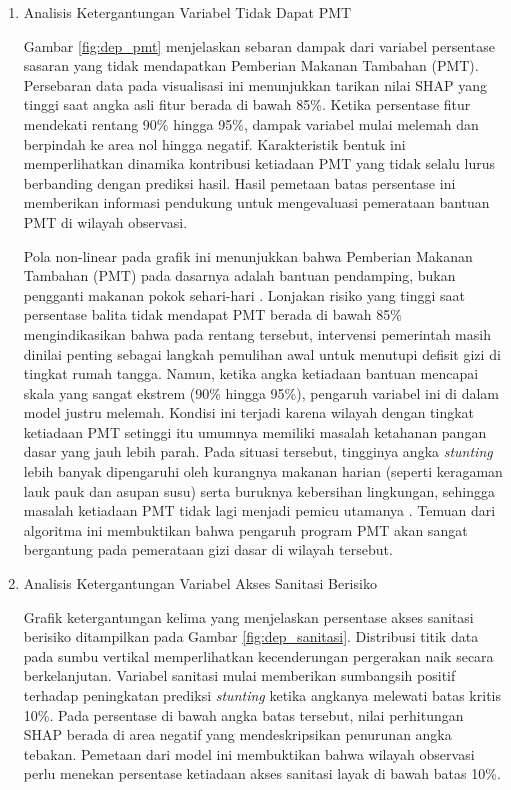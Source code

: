 \begin{enumerate}[listparindent=\parindent]
    \item Analisis Ketergantungan Variabel Tidak Dapat PMT
    
    Gambar \ref{fig:dep_pmt} menjelaskan sebaran dampak dari variabel persentase sasaran yang tidak mendapatkan Pemberian Makanan Tambahan (PMT). Persebaran data pada visualisasi ini menunjukkan tarikan nilai SHAP yang tinggi saat angka asli fitur berada di bawah 85\%. Ketika persentase fitur mendekati rentang 90\% hingga 95\%, dampak variabel mulai melemah dan berpindah ke area nol hingga negatif. Karakteristik bentuk ini memperlihatkan dinamika kontribusi ketiadaan PMT yang tidak selalu lurus berbanding dengan prediksi hasil. Hasil pemetaan batas persentase ini memberikan informasi pendukung untuk mengevaluasi pemerataan bantuan PMT di wilayah observasi.

    \indent Pola non-linear pada grafik ini menunjukkan bahwa Pemberian Makanan Tambahan (PMT) pada dasarnya adalah bantuan pendamping, bukan pengganti makanan pokok sehari-hari \cite{kemenkes2023juknispmt}. Lonjakan risiko yang tinggi saat persentase balita tidak mendapat PMT berada di bawah 85\% mengindikasikan bahwa pada rentang tersebut, intervensi pemerintah masih dinilai penting sebagai langkah pemulihan awal untuk menutupi defisit gizi di tingkat rumah tangga. Namun, ketika angka ketiadaan bantuan mencapai skala yang sangat ekstrem (90\% hingga 95\%), pengaruh variabel ini di dalam model justru melemah. Kondisi ini terjadi karena wilayah dengan tingkat ketiadaan PMT setinggi itu umumnya memiliki masalah ketahanan pangan dasar yang jauh lebih parah. Pada situasi tersebut, tingginya angka \textit{stunting} lebih banyak dipengaruhi oleh kurangnya makanan harian (seperti keragaman lauk pauk dan asupan susu) serta buruknya kebersihan lingkungan, sehingga masalah ketiadaan PMT tidak lagi menjadi pemicu utamanya \cite{keats2021effective}. Temuan dari algoritma ini membuktikan bahwa pengaruh program PMT akan sangat bergantung pada pemerataan gizi dasar di wilayah tersebut.

    \item Analisis Ketergantungan Variabel Akses Sanitasi Berisiko
    
    Grafik ketergantungan kelima yang menjelaskan persentase akses sanitasi berisiko ditampilkan pada Gambar \ref{fig:dep_sanitasi}. Distribusi titik data pada sumbu vertikal memperlihatkan kecenderungan pergerakan naik secara berkelanjutan. Variabel sanitasi mulai memberikan sumbangsih positif terhadap peningkatan prediksi \textit{stunting} ketika angkanya melewati batas kritis 10\%. Pada persentase di bawah angka batas tersebut, nilai perhitungan SHAP berada di area negatif yang mendeskripsikan penurunan angka tebakan. Pemetaan dari model ini membuktikan bahwa wilayah observasi perlu menekan persentase ketiadaan akses sanitasi layak di bawah batas 10\%.


\end{enumerate}
